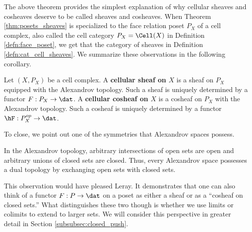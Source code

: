 The above theorem provides the simplest explanation of why cellular sheaves and cosheaves deserve to be called sheaves and cosheaves. When Theorem \ref{thm:posets_sheaves} is specialized to the face relation poset $P_X$ of a cell complex, also called the cell category $P_X=\Cell(X)$ in Definition \ref{defn:face_poset}, we get that the category of sheaves in Definition \ref{defn:cat_cell_sheaves}. We summarize these observations in the following corollary. 

\begin{cor}
	Let $(X,P_X)$ be a cell complex. A \textbf{cellular sheaf on $X$} is a sheaf on $P_X$ equipped with the Alexandrov topology. Such a sheaf is uniquely determined by a functor $F:P_X\to\dat$. A \textbf{cellular cosheaf on $X$} is a cosheaf on $P_X$ with the Alexandrov topology. Such a cosheaf is uniquely determined by a functor $\hF:P_X^{op}\to\dat$.
\end{cor}

To close, we point out one of the symmetries that Alexandrov spaces possess.

\begin{clm}
	In the Alexandrov topology, arbitrary intersections of open sets are open and arbitrary unions of closed sets are closed. Thus, every Alexandrov space possesses a dual topology by exchanging open sets with closed sets.
\end{clm}
This observation would have pleased Leray. It demonstrates that one can also think of a functor $F:P\to\dat$ on a poset as either a sheaf or as a ``cosheaf on closed sets.'' What distinguishes these two though is whether we use limits or colimits to extend to larger sets. We will consider this perspective in greater detail in Section \ref{subsubsec:closed_push}.

